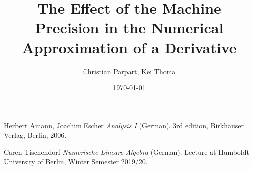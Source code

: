 \documentclass[a4paper,12pt]{scrartcl}
\title{The Effect of the Machine Precision in the Numerical Approximation of a Derivative}
\author{Christian Parpart, Kei Thoma}
\date{\today}
\begin{document}
\maketitle
\tableofcontents







\begin{thebibliography}{2}

Herbert Amann, Joachim Escher
\textit{Analysis I} (German). 
3rd edition, Birkh{\"a}user Verlag, Berlin, 2006.

Caren Tischendorf
\textit{Numerische Lineare Algebra} (German).
Lecture at Humboldt University of Berlin, Winter Semester 2019/20.

\end{thebibliography}
\end{document}
